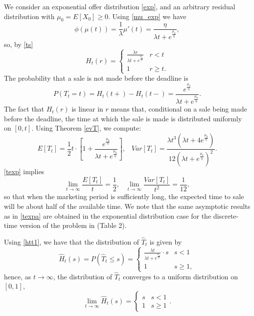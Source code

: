 \documentclass{article}
\numberwithin{equation}{section}
\begin{document}
We consider an exponential offer distribution \eqref{exp},
and an arbitrary residual distribution with $\mu_0=E[X_0]\geq 0$.
Using \eqref{mu_exp} we have
$$\phi(\mu(t))=\frac{1}{\lambda}\mu'(t)=\frac{\eta}{\lambda t+e^{\frac{\mu_0}{\eta}}},$$
so, by \eqref{ts}
\begin{equation}\label{H_exponential}H_t(r)=\begin{cases}\frac{\lambda r}{\lambda t+e^{\frac{\mu_0}{\eta}}}
	& r<t\\
	1& r\geq t.
\end{cases}
\end{equation}
The probability that a sale is not made before the deadline is
$$P(T_t=t)=H_t(t+)-H_t(t-)=\frac{e^{\frac{\mu_0}{\eta}}}{\lambda t+e^{\frac{\mu_0}{\eta}}}
.$$
The fact that $H_t(r)$ is linear in $r$ means that,
conditional on a sale being made before the deadline, the time at which the sale is made is distributed uniformly on $[0,t]$. 
Using Theorem \ref{evT}, we compute:
\begin{equation}\label{texp}E[T_t]=\frac{1}{2}t\cdot \left[1+\frac{e^{\frac{\mu_0}{\eta}} }{\lambda t+e^{\frac{\mu_0}{\eta}}} \right],\;\;\;Var[T_t]=\frac{\lambda t^3(\lambda t+4e^{\frac{\mu_0}{\eta}})}{12(\lambda t+e^{\frac{\mu_0}{\eta}})^2}.
\end{equation}
\eqref{texp} implies
\begin{equation}\label{texpa}\lim_{t\rightarrow \infty}\frac{E[T_t]}{t}=\frac{1}{2},\;\;\;\lim_{t\rightarrow \infty}\frac{Var[T_t]}{t^2}=\frac{1}{12},
\end{equation}
so that when the marketing period is sufficiently long, the expected time to sale will be
about half of the available time.
We note that the same asymptotic results as in \eqref{texpa} are obtained in the exponential distribution case for the discrete-time version of the problem in \cite{entwistle} (Table 2).

Using \eqref{htt1}, we have that the distribution of 
$\hat{T}_t$ is given by
$$\hat{H}_t(s)=P(\hat{T}_t\leq s)=\begin{cases}
\frac{\lambda t}{\lambda t +e^{\frac{\mu_0}{\eta}}}\cdot s & s<1\\
1 & s\geq 1,
\end{cases}$$
hence, as $t\rightarrow \infty$, the distribution of  $\hat{T}_t$ converges to a uniform distribution on $[0,1]$, 
\begin{equation}\label{limH2}\lim_{t\rightarrow\infty}\hat{H}_t(s)=\begin{cases}
	s & s<1\\
	1 & s\geq 1
\end{cases}.\end{equation}
\end{document}
